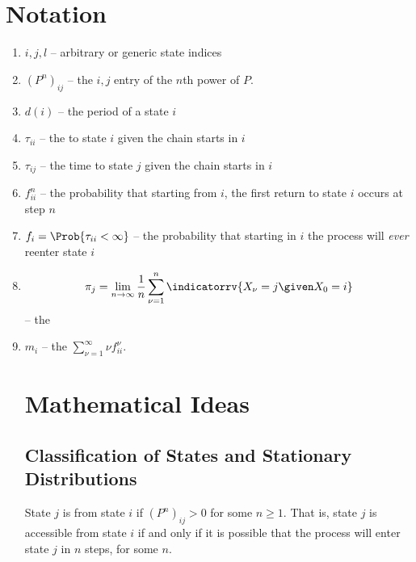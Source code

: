 \documentclass[12pt]{article}
\begin{document}
\hr

\section*{Notation}
\begin{enumerate}
    \item
        \( i, j, l \) -- arbitrary or generic state indices
    \item
        \( (P^n)_{ij} \) -- the \( i,j \) entry of the \( n \)th power
        of \( P \).
      \item  \( d(i) \) -- the period of a state \( i \)
      \item \( \tau_{ii} \) -- the  to
    state \( i \) given the chain starts in \( i \)
      \item \( \tau_{ij} \) -- the time to
    state \( j \) given the chain starts in \( i \)
  \item \( f^n_{ii} \) --  the
    probability that starting from \( i \), the first return to state \(
    i \) occurs at step \( n \)
  \item \( f_i = \Prob{\tau_{ii} < \infty} \)
    -- the probability that starting in \( i \) the process will
    \emph{ever} reenter state \( i \)
  \item     \[
        \pi_j = \lim_{n \to \infty} \frac{1}{n} \sum\limits_{\nu=1}^n
        \indicatorrv{X_{\nu}= j \given X_0 = i}
    \] -- the 
  \item
        \( m_i \) -- the  \( \sum_{\nu=1}^\infty
    \nu f^\nu_{ii} \).

\section*{Mathematical Ideas}

\subsection*{Classification of States and Stationary Distributions}

\begin{definition}
    State \( j \) is  from state \( i \) if \( (P^{n})_
    {ij} > 0 \) for some \( n \ge 1 \).  That is, state \( j \) is
    accessible from state \( i \) if and only if it is possible that the
    process will enter state \( j \) in \( n \) steps, for some \( n \).
\end{definition}


\end{enumerate}
\end{document}
